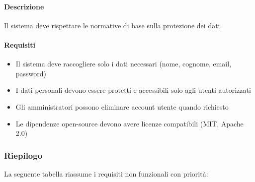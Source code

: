\vspace{0.5cm}


\begin{reqbox}[title=REQ-NFR-07: Conformità Normativa]
\label{subsubsec:req-nfr-legal}

\paragraph{Descrizione}
Il sistema deve rispettare le normative di base sulla protezione dei dati.

\paragraph{Requisiti}
\begin{itemize}[leftmargin=1.1em]
\item Il sistema deve raccogliere solo i dati necessari (nome, cognome, email, password)
\item I dati personali devono essere protetti e accessibili solo agli utenti autorizzati
\item Gli amministratori possono eliminare account utente quando richiesto
\item Le dipendenze open-source devono avere licenze compatibili (MIT, Apache 2.0)
\end{itemize}

\end{reqbox}

\vspace{0.5cm}

\newpage


\subsubsection{Riepilogo}
\label{subsubsec:riepilogo-nfr}

La seguente tabella riassume i requisiti non funzionali con priorità:

